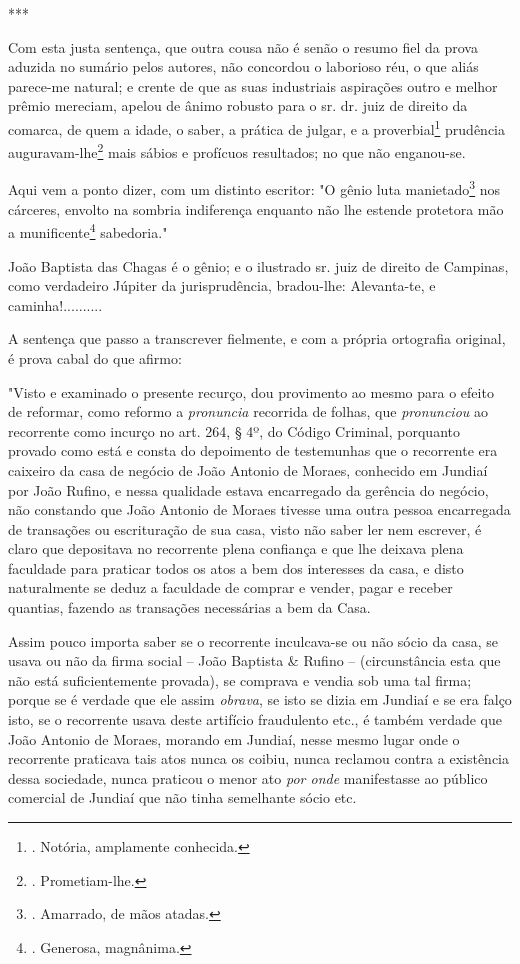 ***

Com esta justa sentença, que outra cousa não é senão o resumo fiel da
prova aduzida no sumário pelos autores, não concordou o laborioso réu, o
que aliás parece-me natural; e crente de que as suas industriais
aspirações outro e melhor prêmio mereciam, apelou de ânimo robusto para
o sr. dr. juiz de direito da comarca, de quem a idade, o saber, a
prática de julgar, e a proverbial\footnote{. Notória, amplamente
  conhecida.} prudência auguravam-lhe\footnote{. Prometiam-lhe.} mais
sábios e profícuos resultados; no que não enganou-se.

Aqui vem a ponto dizer, com um distinto escritor: "O gênio luta
manietado\footnote{. Amarrado, de mãos atadas.} nos cárceres, envolto na
sombria indiferença enquanto não lhe estende protetora mão a
munificente\footnote{. Generosa, magnânima.} sabedoria."

João Baptista das Chagas é o gênio; e o ilustrado sr. juiz de direito de
Campinas, como verdadeiro Júpiter da jurisprudência, bradou-lhe:
Alevanta-te, e caminha!..........

A sentença que passo a transcrever fielmente, e com a própria ortografia
original, é prova cabal do que afirmo:

"Visto e examinado o presente recurço, dou provimento ao mesmo para o
efeito de reformar, como reformo a \emph{pronuncia} recorrida de folhas,
que \emph{pronunciou} ao recorrente como incurço no art. 264, § 4º, do
Código Criminal, porquanto provado como está e consta do depoimento de
testemunhas que o recorrente era caixeiro da casa de negócio de João
Antonio de Moraes, conhecido em Jundiaí por João Rufino, e nessa
qualidade estava encarregado da gerência do negócio, não constando que
João Antonio de Moraes tivesse uma outra pessoa encarregada de
transações ou escrituração de sua casa, visto não saber ler nem
escrever, é claro que depositava no recorrente plena confiança e que lhe
deixava plena faculdade para praticar todos os atos a bem dos interesses
da casa, e disto naturalmente se deduz a faculdade de comprar e vender,
pagar e receber quantias, fazendo as transações necessárias a bem da
Casa.

Assim pouco importa saber se o recorrente inculcava-se ou não sócio da
casa, se usava ou não da firma social -- João Baptista \& Rufino --
(circunstância esta que não está suficientemente provada), se comprava e
vendia sob uma tal firma; porque se é verdade que ele assim
\emph{obrava}, se isto se dizia em Jundiaí e se era falço isto, se o
recorrente usava deste artifício fraudulento etc., é também verdade que
João Antonio de Moraes, morando em Jundiaí, nesse mesmo lugar onde o
recorrente praticava tais atos nunca os coibiu, nunca reclamou contra a
existência dessa sociedade, nunca praticou o menor ato \emph{por onde}
manifestasse ao público comercial de Jundiaí que não tinha semelhante
sócio etc.

